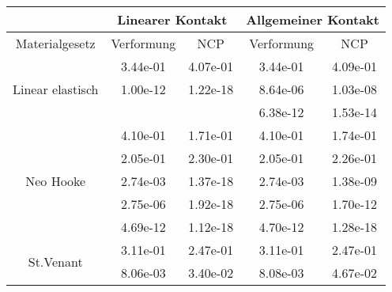 \begin{table} 
\centering 
\begin{tabular}{c|cc|cc|} 
\cline{2-5} 
 & \multicolumn{2}{|c|}{Linearer Kontakt} & \multicolumn{2}{|c|}{Allgemeiner Kontakt} \\ 
\hline 
\multicolumn{1}{|c|}{Materialgesetz} & \multicolumn{1}{c|}{Verformung} & \multicolumn{1}{c|}{NCP} & \multicolumn{1}{c|}{Verformung} & \multicolumn{1}{c|}{NCP} \\ 
\hline 
\multicolumn{1}{|c|}{\multirow{3}{*}{Linear elastisch}} &\multicolumn{1}{|c|}{  3.44e-01} & \multicolumn{1}{|c|}{  4.07e-01} & \multicolumn{1}{|c|}{  3.44e-01} & \multicolumn{1}{|c|}{  4.09e-01} \\ 
\multicolumn{1}{|c|}{} & \multicolumn{1}{|c|}{  1.00e-12} & \multicolumn{1}{|c|}{  1.22e-18} & \multicolumn{1}{|c|}{  8.64e-06} & \multicolumn{1}{|c|}{  1.03e-08} \\ 
\multicolumn{1}{|c|}{} & \multicolumn{1}{|c|}{} & \multicolumn{1}{|c|}{} & \multicolumn{1}{|c|}{  6.38e-12} & \multicolumn{1}{|c|}{  1.53e-14} \\ 
\hline 
\multicolumn{1}{|c|}{\multirow{5}{*}{Neo Hooke}} &\multicolumn{1}{|c|}{  4.10e-01} & \multicolumn{1}{|c|}{  1.71e-01} & \multicolumn{1}{|c|}{  4.10e-01} & \multicolumn{1}{|c|}{  1.74e-01} \\ 
\multicolumn{1}{|c|}{} & \multicolumn{1}{|c|}{  2.05e-01} & \multicolumn{1}{|c|}{  2.30e-01} & \multicolumn{1}{|c|}{  2.05e-01} & \multicolumn{1}{|c|}{  2.26e-01} \\ 
\multicolumn{1}{|c|}{} & \multicolumn{1}{|c|}{  2.74e-03} & \multicolumn{1}{|c|}{  1.37e-18} & \multicolumn{1}{|c|}{  2.74e-03} & \multicolumn{1}{|c|}{  1.38e-09} \\ 
\multicolumn{1}{|c|}{} & \multicolumn{1}{|c|}{  2.75e-06} & \multicolumn{1}{|c|}{  1.92e-18} & \multicolumn{1}{|c|}{  2.75e-06} & \multicolumn{1}{|c|}{  1.70e-12} \\ 
\multicolumn{1}{|c|}{} & \multicolumn{1}{|c|}{  4.69e-12} & \multicolumn{1}{|c|}{  1.12e-18} & \multicolumn{1}{|c|}{  4.70e-12} & \multicolumn{1}{|c|}{  1.28e-18} \\ 
\hline 
\multicolumn{1}{|c|}{\multirow{5}{*}{St.Venant}} &\multicolumn{1}{|c|}{  3.11e-01} & \multicolumn{1}{|c|}{  2.47e-01} & \multicolumn{1}{|c|}{  3.11e-01} & \multicolumn{1}{|c|}{  2.47e-01} \\ 
\multicolumn{1}{|c|}{} & \multicolumn{1}{|c|}{  8.06e-03} & \multicolumn{1}{|c|}{  3.40e-02} & \multicolumn{1}{|c|}{  8.08e-03} & \multicolumn{1}{|c|}{  4.67e-02} \\ 

\end{tabular}
\end{table}
